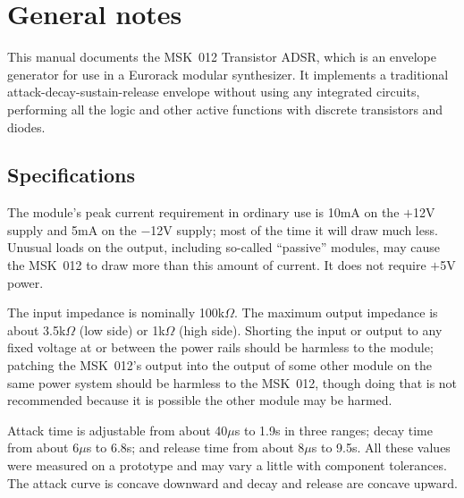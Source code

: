 
%
%
%
%
%
%

\chapter{General notes}

This manual documents the MSK~012 Transistor ADSR, which is an envelope
generator for use in a Eurorack modular synthesizer.
It implements a traditional attack-decay-sustain-release envelope without
using any integrated circuits, performing all the logic and other active
functions with discrete transistors and diodes.

\section{Specifications}

The module's peak current requirement in ordinary use is 10mA on the $+$12V
supply and 5mA on the $-$12V supply; most of the time it will draw much
less.  Unusual loads on the output, including so-called ``passive''
modules, may cause the MSK~012 to draw more than this amount of current.  It
does not require $+$5V power.

The input impedance is nominally 100k$\Omega$.  The maximum output impedance
is about 3.5k$\Omega$ (low side) or 1k$\Omega$ (high side).  Shorting the
input or output to any fixed voltage at or between the power rails should be
harmless to the module; patching the MSK~012's output into the output of
some other module on the same power system should be harmless to the
MSK~012, though doing that is not recommended because it is possible the
other module may be harmed.

Attack time is adjustable from about 40$\mu$s to 1.9s in three ranges; decay
time from about 6$\mu$s to 6.8s; and release time from about 8$\mu$s to
9.5s.  All these values were measured on a prototype and may vary a little
with component tolerances.  The attack curve is concave downward and decay
and release are concave upward.

